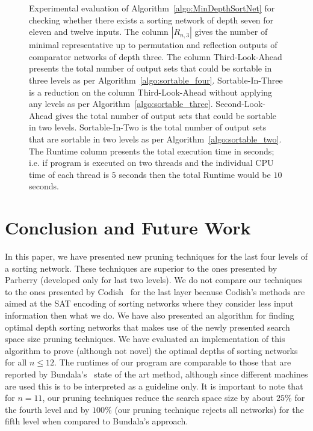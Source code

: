 \documentclass[13pt,a4paper]{article}
\begin{document}
\begin{figure} [H]
\centering
{}
\caption{Experimental evaluation of Algorithm~\ref{algo:MinDepthSortNet} for checking whether there exists a sorting network of depth seven for eleven and twelve inputs. The column $|R_{n, 3}|$ gives the number of minimal representative up to permutation and reflection outputs of comparator networks of depth three. The column Third-Look-Ahead presents the total number of output sets that could be sortable in three levels as per Algorithm~\ref{algo:sortable_four}. Sortable-In-Three is a reduction on the column Third-Look-Ahead without applying any levels as per Algorithm~\ref{algo:sortable_three}. Second-Look-Ahead gives the total number of output sets that could be sortable in two levels. Sortable-In-Two is the total number of output sets that are sortable in two levels as per Algorithm~\ref{algo:sortable_two}. The Runtime column presents the total execution time in seconds; i.e. if program is executed on two threads and the individual CPU time of each thread is $5$ seconds then the total Runtime would be $10$ seconds. }
\label{fig:experiments}
\end{figure}


\section{Conclusion and Future Work}

In this paper, we have presented new pruning techniques for the last four levels of a sorting network. These techniques are superior to the ones presented by Parberry (developed only for last two levels). We do not compare our techniques to the ones presented by Codish~\cite{CodishCS14a_The_End_Game} for the last layer because Codish's methods are aimed at the SAT encoding of sorting networks where they consider less input information then what we do. We have also presented an algorithm for finding optimal depth sorting networks that makes use of the newly presented search space size pruning techniques. We have evaluated an implementation of this algorithm to prove (although not novel) the optimal depths of sorting networks for all $n \leq 12$. The runtimes of our program are comparable to those that are reported by Bundala's~\cite{BundalaCCSZ14_Optimal_Depth} state of the art method, although since different machines are used this is to be interpreted as a guideline only. It is important to note that for $n=11$, our pruning techniques reduce the search space size by about $25 \%$ for the fourth level and by $100 \%$ (our pruning technique rejects all networks) for the fifth level when compared to Bundala's approach. 
\end{document}
